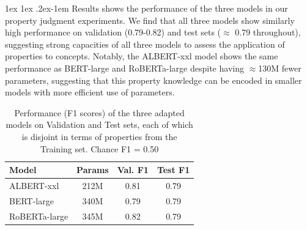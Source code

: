 \documentclass[10pt,letterpaper]{article}
\makeatletter
\newcommand{\km}[1]{\textcolor{purple}{$_{KM}$[#1]}}
\renewcommand{\paragraph}{%
  \@startsection{paragraph}{4}%
  {\z@}{1ex \@plus 1ex \@minus .2ex}{-1em}%
  {\normalfont\normalsize\bfseries}%
}
\makeatother
\begin{document}

\paragraph{Results}
 shows the performance of the three models in our property judgment experiments. 
We find that all three models show similarly high performance on validation (0.79-0.82) and test sets ($\approx$ 0.79 throughout), suggesting strong capacities of all three models to assess the application of properties to concepts. Notably, the ALBERT-xxl model shows the same performance as BERT-large and RoBERTa-large despite having $\approx$130M fewer parameters, suggesting that this property knowledge can be encoded in smaller models with more efficient use of parameters.

\begin{table}[t!]
\vspace{-1em}
\def\arraystretch{1.15}
\centering
\caption{Performance (F1 scores) of the three adapted models on Validation and Test sets, each of which is disjoint in terms of properties from the Training set. Chance F1 = 0.50}
\label{tab:f1}
\vspace{0.5em}
\begin{tabular}{|l|c|c|c|}
\hline
\textbf{Model} & \textbf{Params} & \textbf{Val. F1} & \textbf{Test F1} \\ \hline
ALBERT-xxl     & 212M            & 0.81             & 0.79    \\
BERT-large     & 340M            & 0.79             & 0.79    \\
RoBERTa-large  & 345M            & 0.82    & 0.79    \\ \hline
\end{tabular}
\end{table}
\end{document}
